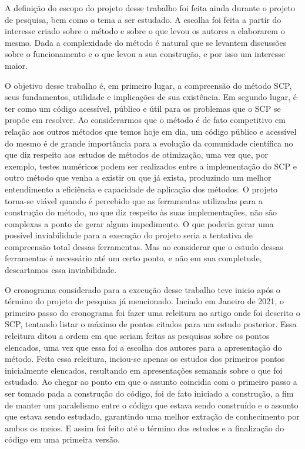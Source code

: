 \noindent
A definição do escopo do projeto desse trabalho foi feita ainda durante o projeto de pesquisa, bem como o tema a ser estudado. A escolha foi feita a partir do interesse criado sobre o método e sobre o que levou os autores a elaborarem o mesmo. Dada a complexidade do método é natural que se levantem discussões sobre o funcionamento e o que levou a sua construção, e por isso um interesse maior.

O objetivo desse trabalho é, em primeiro lugar, a compreensão do método SCP, seus fundamentos, utilidade e implicações de sua existência. Em segundo lugar, é ter como um código acessível, público e útil para os problemas que o SCP se propõe em resolver. Ao considerarmos que o método é de fato competitivo em relação aos outros métodos que temos hoje em dia, um código público e acessível do mesmo é de grande importância para a evolução da comunidade científica no que diz respeito aos estudos de métodos de otimização, uma vez que, por exemplo, testes numéricos podem ser realizados entre a implementação do SCP e outro método que venha a existir ou que já exista, produzindo um melhor entendimento a eficiência e capacidade de aplicação dos métodos. O projeto torna-se viável quando é percebido que as ferramentas utilizadas para a construção do método, no que diz respeito às suas implementações, não são complexas a ponto de gerar algum impedimento. O que poderia gerar uma possível inviabilidade para a execução do projeto seria a tentativa de compreensão total dessas ferramentas. Mas ao considerar que o estudo dessas ferramentas é necessário até um certo ponto, e não em sua completude, descartamos essa inviabilidade.

O cronograma considerado para a execução desse trabalho teve inicio após o término do projeto de pesquisa já mencionado. Inciado em Janeiro de 2021, o primeiro passo do cronograma foi fazer uma releitura no artigo onde foi descrito o SCP, tentando listar o máximo de pontos citados para um estudo posterior. Essa releitura ditou a ordem em que seriam feitas as pesquisas sobre os pontos elencados, uma vez que essa foi a escolha dos autores para a apresentação do método. Feita essa releitura, inciou-se apenas os estudos dos primeiros pontos inicialmente elencados, resultando em apresentações semanais sobre o que foi estudado. Ao chegar ao ponto em que o assunto coincidia com o primeiro passo a ser tomado pada a construção do código, foi de fato iniciado a construção, a fim de manter um paralelismo entre o código que estava sendo construído e o assunto que estava sendo estudado, garantindo uma melhor extração de conhecimento por ambos os meios. E assim foi feito até o término dos estudos e a finalização do código em uma primeira versão.

